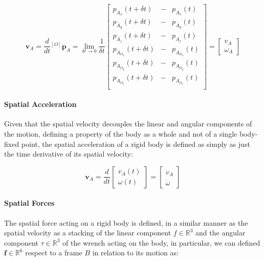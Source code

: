 \begin{equation}
    \mathbf{v} _A = \frac{d}{dt} {}^{[O]}\mathbf{p} _A =
    \lim _{\delta t \to 0} \frac{1}{\delta t}
    \begin{bmatrix}
        p _{A _x} (t + \delta t)     & - & p _{A _x} (t)     \\
        p _{A _y} (t + \delta t)     & - & p _{A _y} (t)     \\
        p _{A _z} (t + \delta t)     & - & p _{A _z} (t)     \\
        p _{A _{O_x}} (t + \delta t) & - & p _{A _{O_x}} (t) \\
        p _{A _{O_y}} (t + \delta t) & - & p _{A _{O_y}} (t) \\
        p _{A _{O_z}} (t + \delta t) & - & p _{A _{O_z}} (t) \\
    \end{bmatrix}
    = \begin{bmatrix}
        v _A \\
        \omega _A
    \end{bmatrix}
\end{equation}

\paragraph{Spatial Acceleration} Given that the spatial velocity decouples the linear and angular components of the motion, defining a property of the body as a whole and not of a single body-fixed point, the spatial acceleration of a rigid body is defined as simply as just the time derivative of its spatial velocity:

\begin{equation}
    \dot{\mathbf{v}} _A = \frac{d}{dt} \begin{bmatrix}
        v _A (t) \\
        \omega (t)
    \end{bmatrix}
    =
    \begin{bmatrix}
        \dot{v} _A \\
        \dot{\omega}
    \end{bmatrix}
\end{equation}

\paragraph{Spatial Forces} The spatial force acting on a rigid body is defined, in a similar manner as the spatial velocity as a stacking of the linear component $f \in \mathbb{R}^3$ and the angular component $\tau \in \mathbb{R}^3$ of the wrench acting on the body, in particular, we can defined $\mathbf{f} \in \mathbb{R}^6$ respect to a frame $B$ in relation to its motion as:

